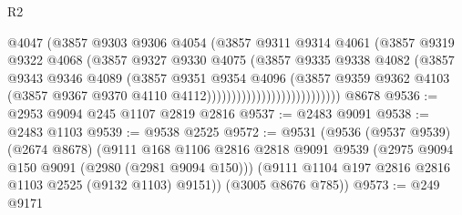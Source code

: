 \begin{lexlean}{R2}
\begin{coremodule}
                                        @4047
                                        (@3857
                                          @9303
                                          @9306
                                          @4054
                                          (@3857
                                            @9311
                                            @9314
                                            @4061
                                            (@3857
                                              @9319
                                              @9322
                                              @4068
                                              (@3857
                                                @9327
                                                @9330
                                                @4075
                                                (@3857
                                                  @9335
                                                  @9338
                                                  @4082
                                                  (@3857
                                                    @9343
                                                    @9346
                                                    @4089
                                                    (@3857
                                                      @9351
                                                      @9354
                                                      @4096
                                                      (@3857
                                                        @9359
                                                        @9362
                                                        @4103
                                                        (@3857
                                                          @9367
                                                          @9370
                                                          @4110
                                                          @4112)))))))))))))))))))))))))))
    @8678
@9536 := @2953 @9094 @245 @1107 @2819 @2816
@9537 := @2483 @9091
@9538 := @2483 @1103
@9539 := @9538 @2525
@9572 := @9531
    (@9536
      (@9537 @9539)
      (@2674 @8678)
      (@9111
        @168
        @1106
        @2816
        @2818
        @9091
        @9539
        (@2975 @9094 @150 @9091 (@2980 (@2981 @9094 @150)))
        (@9111 @1104 @197 @2816 @2816 @1103 @2525 (@9132 @1103) @9151))
      (@3005 @8676 @785))
@9573 := @249 @9171

\end{coremodule}
\end{lexlean}
